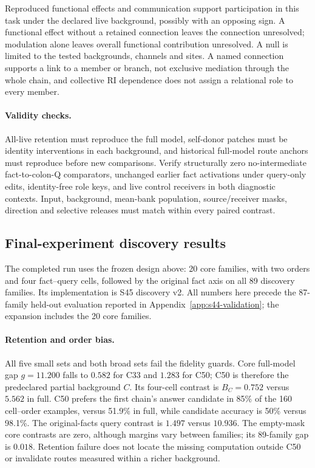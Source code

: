 Reproduced functional effects and communication support participation in this
task under the declared live background, possibly with an opposing sign. A
functional effect without a retained connection leaves the connection unresolved;
modulation alone leaves overall functional contribution unresolved. A null is
limited to the tested backgrounds, channels and sites. A named connection supports
a link to a member or branch, not exclusive mediation through the whole chain,
and collective RI dependence does not assign a relational role to every member.

\paragraph{Validity checks.}
All-live retention must reproduce the full model, self-donor patches must be
identity interventions in each background, and historical full-model route
anchors must reproduce before new comparisons. Verify structurally zero
no-intermediate fact-to-colon-Q comparators, unchanged earlier fact activations
under query-only edits, identity-free role keys, and live control receivers in
both diagnostic contexts. Input, background, mean-bank population, source/receiver
masks, direction and selective releases must match within every paired contrast.

\subsection{Final-experiment discovery results}
\label{app:s44-results}
The completed run uses the frozen design above: 20 core families, with two orders
and four fact--query cells, followed by the original fact axis on all 89 discovery
families. Its implementation is S45 discovery v2. All numbers here precede the
87-family held-out evaluation reported in Appendix~\ref{app:s44-validation};
the expansion includes the 20 core families.

\paragraph{Retention and order bias.}
All five small sets and both broad sets fail the fidelity guards. Core full-model
gap $g=11.200$ falls to $0.582$ for C33 and $1.283$ for C50; C50 is therefore the
predeclared partial background $C$. Its four-cell contrast is $B_C=0.752$ versus
$5.562$ in full. C50 prefers the first chain's answer candidate in 85\% of the
160 cell--order examples, versus 51.9\% in full, while candidate accuracy is
50\% versus 98.1\%. The original-facts query contrast is $1.497$ versus $10.936$.
The empty-mask core contrasts are zero, although margins vary between families;
its 89-family gap is $0.018$. Retention failure does not locate the missing
computation outside C50 or invalidate routes measured within a richer background.

